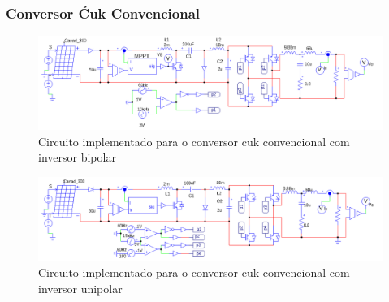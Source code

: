 \documentclass[
	12pt,				%
	openany,
	onseside,
	a4paper,			%
	english,			%
	french,				%
	spanish,			%
	brazil,				%
	]{abntex2}
\begin{document}
\subsubsection{Conversor Ćuk Convencional}
\begin{figure}[htb]%
	\captionsetup{justification=centering}
	\centering
		\includegraphics[width= \linewidth]{comp_conv_circ_clean}
		\caption{Circuito implementado para o conversor cuk convencional com inversor bipolar}
		\label{fig:comp_conv_circ_clean}
\end{figure}
\begin{figure}[htb]%
	\captionsetup{justification=centering}
	\centering
		\includegraphics[width= \linewidth]{comp_conv_circ_clean_unip}
		\caption{Circuito implementado para o conversor cuk convencional com inversor unipolar}
		\label{fig:comp_conv_circ_clean_unip}
\end{figure}
\end{document}
